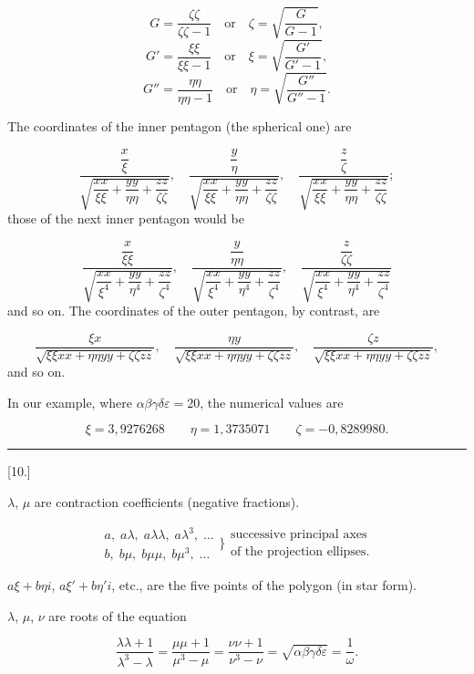 \[
G = \frac{\zeta\zeta}{\zeta\zeta-1} \quad \text{or} \quad \zeta = \sqrt{\frac{G}{G-1}},
\]
\[
G' = \frac{\xi\xi}{\xi\xi-1} \quad \text{or} \quad \xi = \sqrt{\frac{G'}{G'-1}},
\]
\[
G'' = \frac{\eta\eta}{\eta\eta-1} \quad \text{or} \quad \eta = \sqrt{\frac{G''}{G''-1}}.
\]

The coordinates of the inner pentagon (the spherical one) are

\[
\frac{\dfrac{x}{\xi}}{\sqrt{\dfrac{xx}{\xi\xi}+\dfrac{yy}{\eta\eta}+\dfrac{zz}{\zeta\zeta}}}, \quad
\frac{\dfrac{y}{\eta}}{\sqrt{\dfrac{xx}{\xi\xi}+\dfrac{yy}{\eta\eta}+\dfrac{zz}{\zeta\zeta}}}, \quad
\frac{\dfrac{z}{\zeta}}{\sqrt{\dfrac{xx}{\xi\xi}+\dfrac{yy}{\eta\eta}+\dfrac{zz}{\zeta\zeta}}};
\]
those of the next inner pentagon would be

\[
\frac{\dfrac{x}{\xi\xi}}{\sqrt{\dfrac{xx}{\xi^4}+\dfrac{yy}{\eta^4}+\dfrac{zz}{\zeta^4}}}, \quad
\frac{\dfrac{y}{\eta\eta}}{\sqrt{\dfrac{xx}{\xi^4}+\dfrac{yy}{\eta^4}+\dfrac{zz}{\zeta^4}}}, \quad
\frac{\dfrac{z}{\zeta\zeta}}{\sqrt{\dfrac{xx}{\xi^4}+\dfrac{yy}{\eta^4}+\dfrac{zz}{\zeta^4}}}
\]
and so on. The coordinates of the outer pentagon, by contrast, are

\[
\frac{\xi x}{\sqrt{\xi\xi xx+\eta\eta yy+\zeta\zeta zz}}, \quad
\frac{\eta y}{\sqrt{\xi\xi xx+\eta\eta yy+\zeta\zeta zz}}, \quad
\frac{\zeta z}{\sqrt{\xi\xi xx+\eta\eta yy+\zeta\zeta zz}},
\]
and so on.

In our example, where $\alpha\beta\gamma\delta\varepsilon = 20$, the numerical values are

\[
\xi = 3{,}9276268 \qquad \eta = 1{,}3735071 \qquad \zeta = -0{,}8289980.
\]

\begin{center}\rule{3cm}{.4pt}\end{center}

\begin{center}[10.]\end{center}

$\lambda$, $\mu$ are contraction coefficients (negative fractions).

\[
\begin{aligned}
a,\; a\lambda,\; a\lambda\lambda,\; a\lambda^3,\; \ldots \\
b,\; b\mu,\; b\mu\mu,\; b\mu^3,\; \ldots
\end{aligned}
\Bigg\} \begin{gathered}\text{successive principal axes}\\\text{of the projection ellipses.}\end{gathered}
\]

$a\xi+b\eta i$, $a\xi'+b\eta' i$, etc., are the five points of the polygon (in star form).

$\lambda$, $\mu$, $\nu$ are roots of the equation

\[
\frac{\lambda\lambda+1}{\lambda^3-\lambda} = \frac{\mu\mu+1}{\mu^3-\mu} = \frac{\nu\nu+1}{\nu^3-\nu} = \sqrt{\alpha\beta\gamma\delta\varepsilon} = \frac{1}{\omega}.
\]
